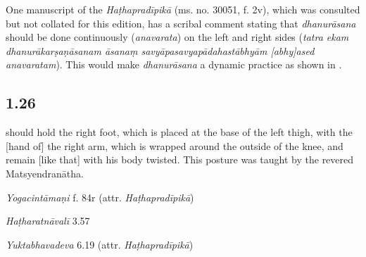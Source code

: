 \begin{ekdosis}
\begin{philcomm}[hp01_025]
One manuscript of the \emph{Haṭhapradīpikā} (ms. no. 30051, f. 2v), which was consulted but not collated for this edition, has a scribal comment stating that \emph{dhanurāsana} should be done continuously (\emph{anavarata}) on the left and right sides (\emph{tatra ekam dhanurākarṣaṇāsanam āsanaṃ savyāpasavyapādahastābhyām [abhy]ased anavaratam}). This would make \emph{dhanurāsana} a dynamic practice as shown in . 
\end{philcomm}

\subsection*{1.26}
\begin{translation} should hold the right foot, which is placed at the base of the left thigh, with the [hand of] the right arm, which is wrapped around the outside of the knee, and remain [like that] with his body twisted. This posture was taught by the revered Matsyendranātha.
\end{translation}

\begin{testimonia}[hp01_026]
\emph{Yogacintāmaṇi} f. 84r (attr. \emph{Haṭhapradīpikā})

\begin{versinnote}
\end{versinnote}

\emph{Haṭharatnāvalī} 3.57

\begin{versinnote}
\tl{\var{°dakṣapādo ] °dakṣapādaṃ P, °dakṣapādau t1}\\!}
\end{versinnote}

\emph{Yuktabhavadeva} 6.19 (attr. \emph{Haṭhapradīpikā})

\begin{versinnote}
\end{versinnote}


\end{testimonia}
\end{ekdosis}

